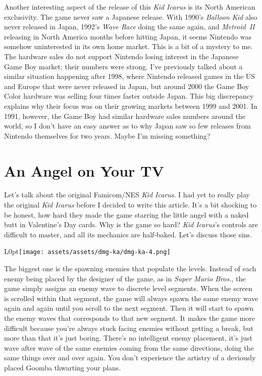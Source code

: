 \documentclass{book}
\begin{document}
Another interesting aspect of the release of this \emph{Kid Icarus} is its North American exclusivity. The game never saw a Japanese release. With 1990’s \emph{Balloon Kid} also never released in Japan, 1992’s \emph{Wave Race} doing the same again, and \emph{Metroid~II} releasing in North America months before hitting Japan, it seems Nintendo was somehow uninterested in its own home market. This is a bit of a mystery to me. The hardware sales do not support Nintendo losing interest in the Japanese Game Boy market: their numbers were strong. I’ve previously talked about a similar situation happening after 1998, where Nintendo released games in the US and Europe that were never released in Japan, but around 2000 the Game Boy Color hardware was selling four times faster outside Japan. This big discrepancy explains why their focus was on their growing markets between 1999 and 2001. In 1991, however, the Game Boy had similar hardware sales numbers around the world, so I don’t have an easy answer as to why Japan saw so few releases from Nintendo themselves for two years. Maybe I’m missing something?\par
\FloatBarrier\section*{An Angel on Your TV}
Let’s talk about the original Famicom/NES \emph{Kid Icarus}. I had yet to really play the original \emph{Kid Icarus} before I decided to write this article. It’s a bit shocking to be honest, how hard they made the game starring the little angel with a naked butt in Valentine’s Day cards. Why is the game so hard? \emph{Kid Icarus}’s controls are difficult to master, and all its mechanics are half-baked. Let’s discuss those sins.\par
\begin{wrapfigure}{L}{0pt}{\texttt{[image: assets/assets/dmg-ka/dmg-ka-4.png]}}\end{wrapfigure}\noindent
The biggest one is the spawning enemies that populate the levels. Instead of each enemy being placed by the designer of the game, as in \emph{Super Mario Bros.}, the game simply assigns an enemy wave to discrete level segments. When the screen is scrolled within that segment, the game will always spawn the same enemy wave again and again until you scroll to the next segment. Then it will start to spawn the enemy waves that corresponds to that new segment. It makes the game more difficult because you’re always stuck facing enemies without getting a break, but more than that it’s just boring. There’s no intelligent enemy placement, it’s just wave after wave of the same enemies coming from the same directions, doing the same things over and over again. You don’t experience the artistry of a deviously placed Goomba thwarting your plans.\par
\end{document}
